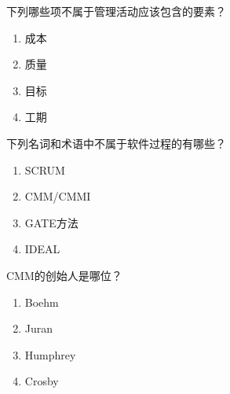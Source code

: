 \begin{problem}
	下列哪些项不属于管理活动应该包含的要素？
    \vspace{-0.8em}
    \begin{multicols}{4}
        \begin{enumerate}[label=\Alph*.]
            \item 成本
            \item 质量
            \item 目标
            \item 工期
        \end{enumerate}
    \end{multicols}
    \vspace{-1em}
\end{problem}



\begin{problem}
	下列名词和术语中不属于软件过程的有哪些？
    \vspace{-0.8em}
    \begin{multicols}{4}
        \begin{enumerate}[label=\Alph*.]
            \item SCRUM
            \item CMM/CMMI
            \item GATE方法
            \item IDEAL
        \end{enumerate}
    \end{multicols}
    \vspace{-1em}
\end{problem}




\begin{problem}
	CMM的创始人是哪位？
    \vspace{-0.8em}
    \begin{multicols}{4}
        \begin{enumerate}[label=\Alph*.]
            \item Boehm
            \item Juran
            \item Humphrey
            \item Crosby
        \end{enumerate}
    \end{multicols}
    \vspace{-1em}
\end{problem}



